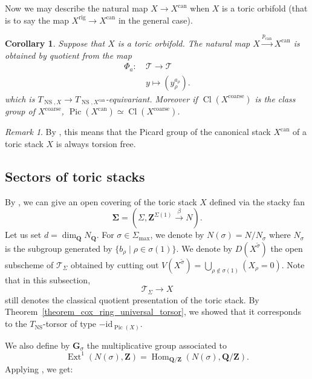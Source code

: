\documentclass{proc-l}
\newcommand{\Z}{\mathbf{Z}}
\newcommand{\Q}{\mathbf{Q}}
\newcommand{\G}{\mathbf{G}}
\DeclareMathOperator{\Pic}{Pic}
\DeclareMathOperator{\can}{can}
\DeclareMathOperator{\Hom}{Hom}
\DeclareMathOperator{\Ext}{Ext}
\DeclareMathOperator{\NS}{NS}
\DeclareMathOperator{\coarse}{coarse}
\DeclareMathOperator{\Cl}{Cl}
\DeclareMathOperator{\rig}{rig}
\newcommand{\stackT}{\mathcal{T}}
\newtheorem{cor}[theorem]{Corollary}
\theoremstyle{definition}
\theoremstyle{remark}
\newtheorem{remark}[theorem]{Remark}
\numberwithin{equation}{section}
\begin{document}
Now we may describe the natural map $X \rightarrow X^{\can}$ when $X$ is a toric orbifold (that is to say the map $X^{\rig} \rightarrow X^{\can}$ in the general case).

\begin{cor}\label{cor_description_map_stack_to_canonical}
Suppose that $X$ is a toric orbifold. The natural map $X \xrightarrow{p_{\can}} X^{\can}$ is obtained by quotient from the map 
\begin{align*}
\Phi_a : \  &\stackT \rightarrow \stackT \\
&y \longmapsto (y_{\rho}^{a_{\rho}}) . 
\end{align*}which is $T_{\NS,X} \rightarrow T_{\NS,X^{\can}}$-equivariant. Moreover if $\Cl(X^{\coarse})$ is the class group of $X^{\coarse}$, $\Pic(X^{\can}) \simeq \Cl(X^{\coarse})$.
\end{cor}

\begin{remark}\label{remark_picard_group_canonical_stack}
    By \cite[Theorem 4.1.3]{CoxLittleSchenck2011}, this means that the Picard group of the canonical stack $X^{\can}$ of a toric stack $X$ is always torsion free.
\end{remark}






\subsection{Sectors of toric stacks}

By \cite[proposition 4.3, remark 4.4]{borisov_toric_stack}, we can give an open covering of the toric stack $X$ defined via the stacky fan $$\mathbf{\Sigma} = (\Sigma,\Z^{\Sigma(1)} \xrightarrow{\beta} N).$$Let us set $d = \dim_{\Q} N_{\Q}$. For $\sigma \in \Sigma_{\max}$, we denote by $N(\sigma) = N / N_{\sigma}$ where $N_{\sigma}$ is the subgroup generated by $\{ b_{\rho} \mid \rho \in \sigma(1) \}$. We denote by $D(X^{\tilde{\sigma}})$ the open subscheme of $\stackT_{\Sigma}$ obtained by cutting out $V(X^{\tilde{\sigma}}) = \bigcup\limits_{\rho \not\in \sigma(1)} \left( X_{\rho} = 0 \right) $. Note that in this subsection, $$\stackT_{\Sigma} \rightarrow X$$still denotes the classical quotient presentation of the toric stack. By Theorem~\ref{theorem_cox_ring_universal_torsor}, we showed that it corresponds to the $T_{\NS}$-torsor of type $-\mathrm{id}_{\Pic(X)}$.


We also define by $\G_{\sigma}$ the multiplicative group associated to 
\begin{equation}\label{equation_identification_ext_1}
    \Ext^1(N(\sigma),\Z) = \Hom_{\Q/\Z}(N(\sigma),\Q/\Z).
\end{equation}Applying \cite[proposition 4.3]{borisov_toric_stack}, we get:
\end{document}

